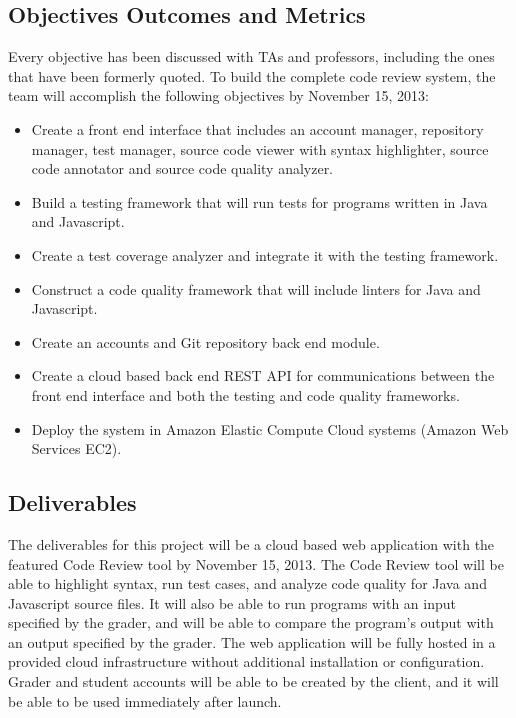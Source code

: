 
\subsection{Objectives Outcomes and Metrics}

Every objective has been discussed with TAs and professors, including the ones
that have been formerly quoted. To build the complete code review system, the
team will accomplish the following objectives by November 15, 2013:

\begin{itemize}
\item Create a front end interface that includes an account
manager, repository manager, test manager, source code viewer with syntax
highlighter, source code annotator and source code quality analyzer.

\item Build a testing framework that will run tests for programs written in 
Java and Javascript.

\item Create a test coverage analyzer and integrate it with the testing
framework.

\item Construct a code quality framework that will include linters for Java
and Javascript.

\item Create an accounts and Git repository back end module.

\item Create a cloud based back end REST API for communications between the
front end interface and both the testing and code quality frameworks.

\item Deploy the system in Amazon Elastic Compute Cloud systems (Amazon Web
Services EC2).

\end{itemize}
\subsection{Deliverables}

The deliverables for this project will be a cloud based web application with the
featured Code Review tool by November 15, 2013. The Code Review tool will be
able to highlight syntax, run test cases, and analyze code quality for Java
and Javascript source files. It will also be able to run programs with an input
specified by the grader, and will be able to compare the program's output with
an output specified by the grader. The web application will be fully hosted in a
provided cloud infrastructure without additional installation or configuration.
Grader and student accounts will be able to be created by the client, and it
will be able to be used immediately after launch.
